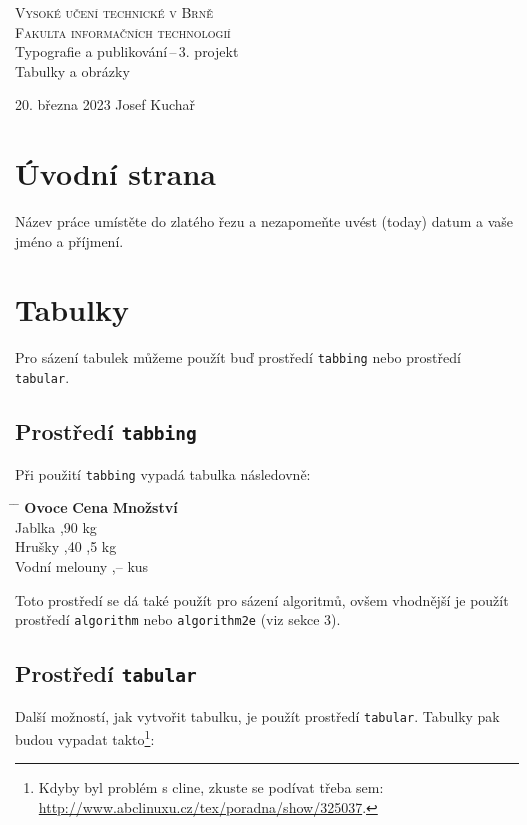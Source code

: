 \documentclass[11pt]{article}
\theoremstyle{plain}
\theoremstyle{plain}
\begin{document}
\begin{titlepage}
    \begin{center}
        {\textsc{{\Huge Vysoké učení technické v Brně\\[0.5em]\huge{Fakulta informačních technologií}}\\}}
        {\LARGE{Typografie a publikování\,--\,3. projekt}\\[0.4em]}
        {\LARGE{Tabulky a obrázky}}
    \end{center}
    {\Large 20. března 2023 \hfill Josef Kuchař}
\end{titlepage}
\clearpage

\section{Úvodní strana}
Název práce umístěte do zlatého řezu a nezapomeňte uvést  (today) datum a vaše jméno a příjmení.

\section{Tabulky}
Pro sázení tabulek můžeme použít buď prostředí \verb|tabbing| nebo prostředí \verb|tabular|.

\subsection{Prostředí \texttt{tabbing}}
Při použití \verb|tabbing| vypadá tabulka následovně:

\begin{tabbing}
    \hspace{7em} \= \hspace{3em} \= \kill
    \textbf{Ovoce} \> \textbf{Cena} \> \textbf{Množství} \\
    Jablka ,90  kg \\
    Hrušky ,40 ,5 kg \\
    Vodní melouny ,--  kus \\
\end{tabbing}
Toto prostředí se dá také použít pro sázení algoritmů, ovšem vhodnější je použít prostředí \verb|algorithm| nebo \verb|algorithm2e| (viz sekce 3).

\subsection{Prostředí \texttt{tabular}}
Další možností, jak vytvořit tabulku, je použít prostředí \verb|tabular|. Tabulky pak budou vypadat takto\footnote{Kdyby byl problém s cline, zkuste se podívat třeba sem: \url{http://www.abclinuxu.cz/tex/poradna/show/325037}.}:
\end{document}
